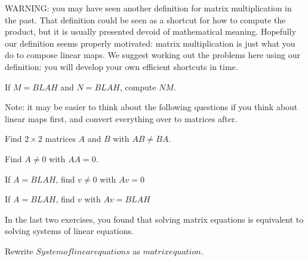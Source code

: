 	WARNING:  you may have seen another definition for matrix multiplication in the past.  That definition could be seen as a shortcut for how
	to compute the product, but it is usually presented devoid of mathematical meaning.  Hopefully our definition seems properly motivated:  matrix multiplication is 
	just what you do to compose linear maps.  We suggest working out the problems here using our definition:  you will develop your own efficient shortcuts in time.
	
	\begin{question}
		If $M = BLAH$ and $N=BLAH$, compute $NM$.
	\end{question}
	
	Note:  it may be easier to think about the following questions if you think about linear maps first, and convert everything over to matrices after.
	
	\begin{question}
		Find $2\times 2$ matrices $A$ and $B$ with $AB \neq BA$.
	\end{question}
	
	\begin{question}
		Find $A \neq 0$  with $AA = 0$.
	\end{question}
	
	\begin{question}
		If $A = BLAH$, find $v \neq 0$ with $Av = 0$ 
	\end{question}
	
	\begin{question}
		If $A = BLAH$, find $v$ with $Av = BLAH$ 
	\end{question}
	
	In the last two exercises, you found that solving matrix equations is equivalent to solving systems of linear equations.
	
	\begin{question}
	Rewrite  $System of linear equations$ as $matrix equation$.
	\end{question}
	
